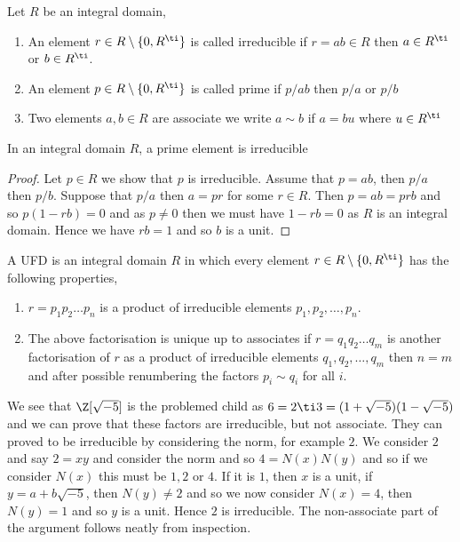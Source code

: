 \begin{ndefi}
  Let $R$ be an integral domain,
  \begin{enumerate}
    \item An element $r \in R \setminus \{0, R^\ti\}$ is called irreducible if $r = ab \in R$ then $a \in R^\ti$ or $b \in R^\ti$.
    \item An element $p \in R\setminus\{0, R^\ti\}$ is called prime if $p/ab$ then $p/a$ or $p/b$
    \item Two elements $a, b \in R$ are associate we write $a \sim b$ if $a = bu$ where $u \in R^\ti$
  \end{enumerate}
\end{ndefi}

\begin{nprop}
   In an integral domain $R$, a prime element is irreducible
\end{nprop}
\begin{proof}
  Let $p \in R$ we show that $p$ is irreducible. Assume that $p = ab$, then $p/a$ then $p/b$. Suppose that $p/a$ then $a = pr$ for some $r \in R$. Then $p = ab = prb$ and so $p(1 - rb) = 0$ and as $p \ne 0$ then we must have $1 - rb = 0$ as $R$ is an integral domain. Hence we have $rb = 1$ and so $b$ is a unit.
\end{proof}

\begin{ndefi}
  A UFD is an integral domain $R$ in which every element $r \in R\setminus \{0, R^\ti\}$ has the following properties,
  \begin{enumerate}
    \item $r = p_1p_2\dots p_n$ is a product of irreducible elements $p_1, p_2, \dots, p_n$.
    \item The above factorisation is unique up to associates if $r = q_1q_2 \dots q_m$ is another factorisation of $r$ as a product of irreducible elements $q_1, q_2, \dots, q_m$ then $n = m$ and after possible renumbering the factors $p_i \sim q_i$ for all $i$.
  \end{enumerate}
\end{ndefi}

We see that $\Z[\sqrt{-5}]$ is the problemed child as $6 = 2 \ti 3 = (1 + \sqrt{-5})(1 - \sqrt{-5})$ and we can prove that these factors are irreducible, but not associate. They can proved to be irreducible by considering the norm, for example $2$. We consider $2$ and say $2 = xy$ and consider the norm and so $4 = N(x)N(y)$ and so if we consider $N(x)$ this must be $1, 2$ or $4$. If it is $1$, then $x$ is a unit, if $y = a + b\sqrt{-5}$, then $N(y) \ne 2$ and so we now consider $N(x) = 4$, then $N(y) = 1$ and so $y$  is a unit. Hence $2$ is irreducible.
The non-associate part of the argument follows neatly from inspection.

